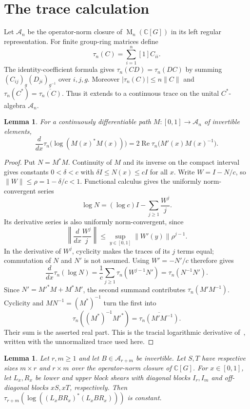 \documentclass[11pt]{article}
\newtheorem{lemma}[theorem]{Lemma}
\theoremstyle{remark}
\numberwithin{equation}{section}
\newcommand{\C}{\mathbb C}
\newcommand{\Mat}{\operatorname{M}}
\begin{document}
\section{The trace calculation}
\label{sec:analysis}

Let $\mathcal A_n$ be the operator-norm closure of
$\Mat_n(\C[G])$ in its left regular representation. For finite
group-ring matrices define
\[
 \tau_n(C)=\sum_{i=1}^n[1]C_{ii}.
\]
The identity-coefficient formula gives
$\tau_n(CD)=\tau_n(DC)$ by summing
$(C_{ij})_g(D_{ji})_{g^{-1}}$ over $i,j,g$. Moreover
$|\tau_n(C)|\le n\|C\|$ and
$\tau_n(C^*)=\overline{\tau_n(C)}$. Thus it extends to a
continuous trace on the unital $C^*$-algebra $\mathcal A_n$.

\begin{lemma}\label{lem:logderivative}
For a continuously differentiable path
$M:[0,1]\to\mathcal A_n$ of invertible elements,
\[
 \frac{d}{dx}\tau_n\bigl(\log(M(x)^*M(x))\bigr)
 =2\operatorname{Re}\tau_n\bigl(M'(x)M(x)^{-1}\bigr).
\]
\end{lemma}

\begin{proof}
Put $N=M^*M$. Continuity of $M$ and its inverse on the compact
interval gives constants $0<\delta<c$ with
$\delta I\le N(x)\le cI$ for all $x$. Write
$W=I-N/c$, so $\|W\|\le\rho=1-\delta/c<1$. Functional calculus
gives the uniformly norm-convergent series
\[
 \log N=(\log c)I-\sum_{j\ge1}\frac{W^j}{j}.
\]
Its derivative series is also uniformly norm-convergent, since
\[
 \left\|\frac{d}{dx}\frac{W^j}{j}\right\|
 \le\sup_{y\in[0,1]}\|W'(y)\|\rho^{j-1}.
\]
In the derivative of $W^j$, cyclicity makes the traces of its
$j$ terms equal; commutation of $N$ and $N'$ is not assumed.
Using $W'=-N'/c$ therefore gives
\[
 \frac{d}{dx}\tau_n(\log N)
 =\frac1c\sum_{j\ge1}\tau_n(W^{j-1}N')
 =\tau_n(N^{-1}N').
\]
Since $N'=M'^*M+M^*M'$, the second summand contributes
$\tau_n(M'M^{-1})$. Cyclicity and
$MN^{-1}=(M^*)^{-1}$ turn the first into
\[
 \tau_n((M^*)^{-1}M'^*)
 =\overline{\tau_n(M'M^{-1})}.
\]
Their sum is the asserted real part. This is the tracial
logarithmic derivative of~\cite[Lemma 2]{FK1952}, written with
the unnormalized trace used here.
\end{proof}

\begin{lemma}\label{lem:shears}
Let $r,m\ge1$ and let $B\in\mathcal A_{r+m}$ be invertible.
Let $S,T$ have respective sizes $m\times r$ and $r\times m$ over
the operator-norm closure of $\C[G]$. For $x\in[0,1]$, let
$L_x,R_x$ be lower and upper block shears with diagonal blocks
$I_r,I_m$ and off-diagonal blocks $xS,xT$, respectively.
Then $\tau_{r+m}(\log((L_xBR_x)^*(L_xBR_x)))$ is constant.
\end{lemma}
\end{document}
